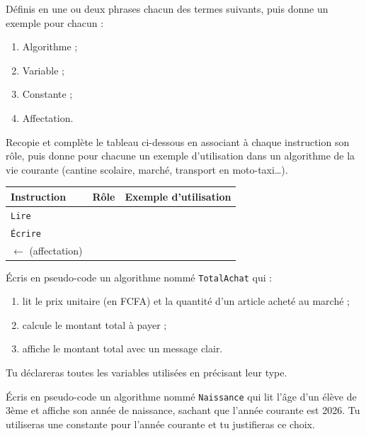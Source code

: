 \documentclass[11pt]{article}
\newcounter{popsec}
\newcounter{popsub}
\newcommand{\courssub}[1]{%
  \stepcounter{popsub}%
  \par\vspace{9pt}\noindent{\popxbold\fontsize{11.5}{13}\selectfont\color{popink}{\color{poporange}\thepopsec.\thepopsub}\hspace{6pt}#1}\par\nopagebreak\vspace{4pt}
}
\begin{document}
\begin{exercice}[Définitions]
Définis en une ou deux phrases chacun des termes suivants, puis donne un exemple pour chacun :
\begin{enumerate}
\item Algorithme ;
\item Variable ;
\item Constante ;
\item Affectation.
\end{enumerate}
\end{exercice}

\begin{exercice}
Recopie et complète le tableau ci-dessous en associant à chaque instruction son rôle, puis donne pour chacune un exemple d'utilisation dans un algorithme de la vie courante (cantine scolaire, marché, transport en moto-taxi\ldots).

\begin{center}
\begin{tabularx}{\linewidth}{|l|X|X|}
\hline
\rowcolor{popblueL} \textbf{Instruction} & \textbf{Rôle} & \textbf{Exemple d'utilisation} \\
\hline
\texttt{Lire} & & \\
\hline
\texttt{Écrire} & & \\
\hline
$\leftarrow$ (affectation) & & \\
\hline
\end{tabularx}
\end{center}
\end{exercice}

\courssub{Je m'entraîne}

\begin{exercice}
Écris en pseudo-code un algorithme nommé \texttt{TotalAchat} qui :
\begin{enumerate}
\item lit le prix unitaire (en FCFA) et la quantité d'un article acheté au marché ;
\item calcule le montant total à payer ;
\item affiche le montant total avec un message clair.
\end{enumerate}
Tu déclareras toutes les variables utilisées en précisant leur type.
\end{exercice}

\begin{exercice}
Écris en pseudo-code un algorithme nommé \texttt{Naissance} qui lit l'âge d'un élève de 3ème et affiche son année de naissance, sachant que l'année courante est 2026. Tu utiliseras une constante pour l'année courante et tu justifieras ce choix.
\end{exercice}
\end{document}
